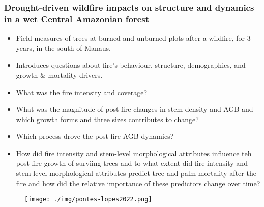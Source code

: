 \documentclass{beamer}
\begin{document}
\begin{frame}[t, allowframebreaks]
    \frametitle{Drought-driven wildfire impacts on structure and dynamics in a 
    wet Central Amazonian forest~\cite{pontes-lopes2021}}
    \begin{itemize}
        \item Field measures of trees at burned and unburned plots after a 
            wildfire, for 3 years, in the south of Manaus.
        \item Introduces questions about fire's behaviour, structure, 
            demographics, and growth \& mortality drivers.
        \item What was the fire intensity and coverage?
        \item What was the magnitude of post-fire changes in stem density and 
            AGB and which growth forms and three sizes contributes to change?
        \item Which process drove the post-fire AGB dynamics?
        \item How did fire intensity and stem-level morphological attributes
            influence teh post-fire growth of surviing trees and to what extent 
            did fire intensity and stem-level morphological attributes predict 
            tree and palm mortality after the fire and how did the relative 
            importance of these predictors change over time?
    \end{itemize}
    \begin{figure}
        \centering
        \texttt{[image: ./img/pontes-lopes2022.png]}
    \end{figure}
\end{frame}
\end{document}
